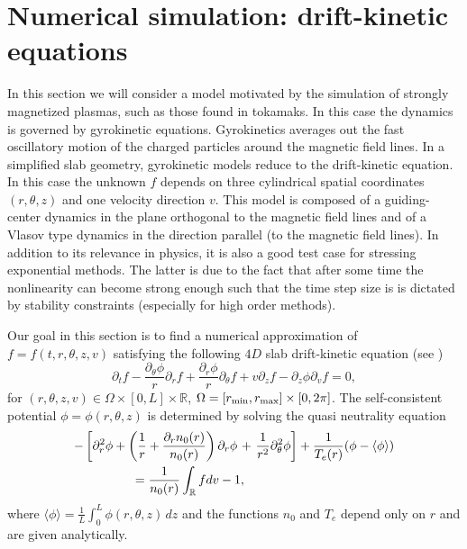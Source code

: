  
\section{Numerical simulation: drift-kinetic equations \label{sec:dk}}

In this section we will consider a model motivated by the simulation of strongly magnetized plasmas, such as those found in tokamaks. In this case the dynamics is governed by gyrokinetic equations. Gyrokinetics averages out the fast oscillatory motion of the charged particles around the magnetic field lines. In a simplified slab geometry, gyrokinetic models reduce to the drift-kinetic equation. In this case the unknown $f$ depends on three cylindrical spatial coordinates $(r,\theta,z)$ and one velocity direction $v$. This model is composed of a guiding-center dynamics in the plane orthogonal to the magnetic field lines and of a Vlasov type dynamics in the direction parallel (to the magnetic field lines). In addition to its relevance in physics, it is also a good test case for stressing exponential methods. The latter is due to the fact that after some time the nonlinearity can become strong enough such that the time step size is is dictated by stability constraints (especially for high order methods).

Our goal in this section is to find a numerical approximation of $f=f(t,r,\theta,z,v)$ satisfying the following $4D$ slab drift-kinetic equation (see \cite{Grandgirard:2006})
\begin{equation}
\label{dk}
\partial_tf-\frac{\partial_\theta \phi}{r}\partial_rf+\frac{\partial_r \phi}{r}\partial_\theta f
+v\partial_zf-\partial_z\phi\partial_{v}f=0,
\end{equation}
for $(r,\theta,z,v)\in \Omega\times[0,L]\times \mathbb{R}$, $\Omega=[r_{\rm min},r_{\rm max}]\times [0, 2\pi]$.
The self-consistent potential $\phi=\phi(r,\theta,z)$ is determined by solving the quasi neutrality equation
\begin{align}
    -\left[\partial_r^2\phi+\left(\frac{1}{r}+\frac{\partial_r n_0(r)}{n_0(r)}\right)\partial_r\phi \right.&+\left.\frac{1}{r^2}\partial_\theta^2\phi\right]+\frac{1}{T_e(r)}(\phi-\langle\phi\rangle)\nonumber\\
\label{qn}
&\hspace{-3cm}=\frac{1}{n_0(r)}\int_{\mathbb{R}} fdv-1,
\end{align}
where $\langle\phi\rangle = \frac{1}{L}\int_0^L \phi(r,\theta,z)\,dz$ and the functions $n_0$ and $T_e$ depend only on $r$ and are given analytically.


